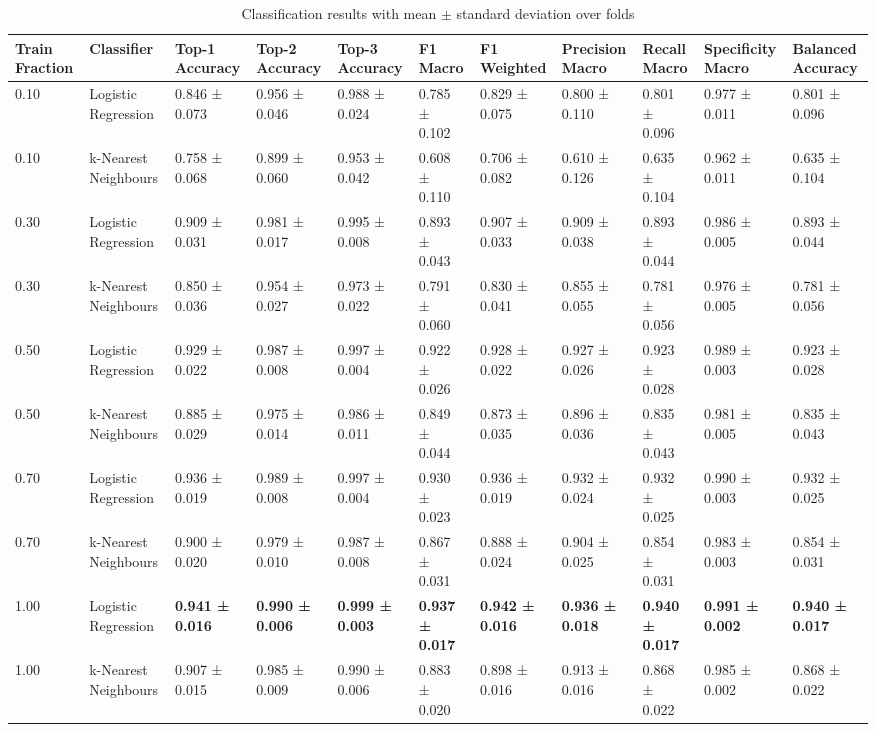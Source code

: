 
\begin{table}[ht]
\centering
\tiny
\caption{Classification results with mean $\pm$ standard deviation over folds}
\label{tab:classification_results}
\begin{tabularx}{\textwidth}{lXXXXXXXXXX}
\toprule
Train Fraction & Classifier & Top-1 Accuracy & Top-2 Accuracy & Top-3 Accuracy & F1 Macro & F1 Weighted & Precision Macro & Recall Macro & Specificity Macro & Balanced Accuracy \\
\midrule
0.10 & Logistic Regression & 0.846 ± 0.073 & 0.956 ± 0.046 & 0.988 ± 0.024 & 0.785 ± 0.102 & 0.829 ± 0.075 & 0.800 ± 0.110 & 0.801 ± 0.096 & 0.977 ± 0.011 & 0.801 ± 0.096 \\
0.10 & k-Nearest Neighbours & 0.758 ± 0.068 & 0.899 ± 0.060 & 0.953 ± 0.042 & 0.608 ± 0.110 & 0.706 ± 0.082 & 0.610 ± 0.126 & 0.635 ± 0.104 & 0.962 ± 0.011 & 0.635 ± 0.104 \\
0.30 & Logistic Regression & 0.909 ± 0.031 & 0.981 ± 0.017 & 0.995 ± 0.008 & 0.893 ± 0.043 & 0.907 ± 0.033 & 0.909 ± 0.038 & 0.893 ± 0.044 & 0.986 ± 0.005 & 0.893 ± 0.044 \\
0.30 & k-Nearest Neighbours & 0.850 ± 0.036 & 0.954 ± 0.027 & 0.973 ± 0.022 & 0.791 ± 0.060 & 0.830 ± 0.041 & 0.855 ± 0.055 & 0.781 ± 0.056 & 0.976 ± 0.005 & 0.781 ± 0.056 \\
0.50 & Logistic Regression & 0.929 ± 0.022 & 0.987 ± 0.008 & 0.997 ± 0.004 & 0.922 ± 0.026 & 0.928 ± 0.022 & 0.927 ± 0.026 & 0.923 ± 0.028 & 0.989 ± 0.003 & 0.923 ± 0.028 \\
0.50 & k-Nearest Neighbours & 0.885 ± 0.029 & 0.975 ± 0.014 & 0.986 ± 0.011 & 0.849 ± 0.044 & 0.873 ± 0.035 & 0.896 ± 0.036 & 0.835 ± 0.043 & 0.981 ± 0.005 & 0.835 ± 0.043 \\
0.70 & Logistic Regression & 0.936 ± 0.019 & 0.989 ± 0.008 & 0.997 ± 0.004 & 0.930 ± 0.023 & 0.936 ± 0.019 & 0.932 ± 0.024 & 0.932 ± 0.025 & 0.990 ± 0.003 & 0.932 ± 0.025 \\
0.70 & k-Nearest Neighbours & 0.900 ± 0.020 & 0.979 ± 0.010 & 0.987 ± 0.008 & 0.867 ± 0.031 & 0.888 ± 0.024 & 0.904 ± 0.025 & 0.854 ± 0.031 & 0.983 ± 0.003 & 0.854 ± 0.031 \\
1.00 & Logistic Regression & \textbf{0.941 ± 0.016} & \textbf{0.990 ± 0.006} & \textbf{0.999 ± 0.003} & \textbf{0.937 ± 0.017} & \textbf{0.942 ± 0.016} & \textbf{0.936 ± 0.018} & \textbf{0.940 ± 0.017} & \textbf{0.991 ± 0.002} & \textbf{0.940 ± 0.017} \\
1.00 & k-Nearest Neighbours & 0.907 ± 0.015 & 0.985 ± 0.009 & 0.990 ± 0.006 & 0.883 ± 0.020 & 0.898 ± 0.016 & 0.913 ± 0.016 & 0.868 ± 0.022 & 0.985 ± 0.002 & 0.868 ± 0.022 \\
\bottomrule
\bottomrule
\end{tabularx}
\end{table}
